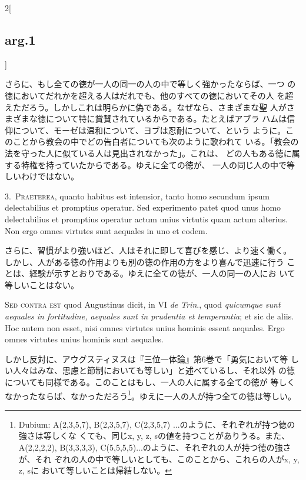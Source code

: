 \documentclass[paper=a4paper,fontsize=10pt,jafontsize=9pt,titlepage]{jlreq}
\begin{document}
\begin{paracol}{2}[\subsection{arg.1}]
\switchcolumn

さらに、もし全ての徳が一人の同一の人の中で等しく強かったならば、一つ
 の徳においてだれかを超える人はだれでも、他のすべての徳においてその人
 を超えただろう。しかしこれは明らかに偽である。なぜなら、さまざまな聖
 人がさまざまな徳について特に賞賛されているからである。たとえばアブラ
 ハムは信仰について、モーゼは温和について、ヨブは忍耐について、という
 ように。このことから教会の中でどの告白者についても次のように歌われて
 いる。「教会の法を守った人に似ている人は見出されなかった」。これは、
 どの人もある徳に属する特権を持っていたからである。ゆえに全ての徳が、
 一人の同じ人の中で等しいわけではない。


3.~{\scshape Praeterea}, quanto habitus est intensior, tanto homo
secundum ipsum delectabilius et promptius operatur. Sed experimento
patet quod unus homo delectabilius et promptius operatur actum unius
virtutis quam actum alterius. Non ergo omnes virtutes sunt aequales in
uno et eodem.

\switchcolumn

さらに、習慣がより強いほど、人はそれに即して喜びを感じ、より速く働く。
 しかし、人がある徳の作用よりも別の徳の作用の方をより喜んで迅速に行う
 ことは、経験が示すとおりである。ゆえに全ての徳が、一人の同一の人にお
 いて等しいことはない。

\switchcolumn*[\subsection{s.c.}]

{\scshape Sed contra est} quod Augustinus dicit, in VI {\itshape de
Trin}., quod {\itshape quicumque sunt aequales in fortitudine,
aequales sunt in prudentia et temperantia}; et sic de aliis. Hoc autem
non esset, nisi omnes virtutes unius hominis essent aequales. Ergo
omnes virtutes unius hominis sunt aequales.

\switchcolumn

しかし反対に、アウグスティヌスは『三位一体論』第6巻で「勇気において等
 しい人々はみな、思慮と節制においても等しい」と述べているし、それ以外
 の徳についても同様である。このことはもし、一人の人に属する全ての徳が
 等しくなかったならば、なかっただろう\footnote{Dubium: A(2,3,5,7),
 B(2,3,5,7), C(2,3,5,7) ...のように、それぞれが持つ徳の強さは等しくな
 くても、同じx, y, z, sの値を持つことがありうる。また、A(2,2,2,2),
 B(3,3,3,3), C(5,5,5,5)...のように、それぞれの人が持つ徳の強さが、それ
 ぞれの人の中で等しいとしても、このことから、これらの人がx, y, z, sに
 おいて等しいことは帰結しない。}。ゆえに一人の人が持つ全ての徳は等しい。


\end{paracol}
\end{document}
